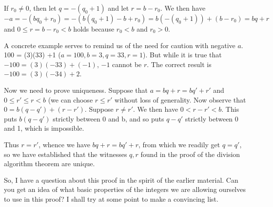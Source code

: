 \documentclass[12pt]{article}
\begin{document}
\begin{description}
If $r_0 \neq 0$, then let $q = -(q_0+1)$ and let $r = b-r_0$.  We then have $-a = -(bq_0+r_0) = -(b(q_0+1)-b+r_0) = b(-(q_0+1)) + (b-r_0) = bq+r$ and $0 \leq r = b-r_0 < b$ holds because $r_0<b$ and $r_0>0$.

A concrete example serves to remind us of the need for caution with negative $a$.  100 = (3)(33) +1 ($a=100, b=3, q = 33, r =1$).  But while it is true that $-100 = (3)(-33) + (-1)$, $-1$ cannot be $r$.  The correct result is $-100 = (3)(-34)+2$.

Now we need to prove uniqueness.  Suppose that $a=bq+r = bq'+r'$ and $0 \leq r' \leq r <b$ (we can choose
$r \leq r'$ without loss of generality.  Now observe that $0 = b(q-q') + (r-r')$.  Suppose $r \neq r'$.  We then have
$0 <r-r'<b$.  This puts $b(q-q')$ strictly between 0 and b, and so puts $q-q'$ strictly between 0 and 1, which is impossible.

Thus $r=r'$, whence we have $bq+r = bq'+r$, from which we readily get $q=q'$, so we have established that the witnesses $q,r$ found in the proof of the division algorithm theorem are unique.

So, I have a question about this proof in the spirit of the earlier material.  Can you get an idea of what basic properties of the integers we are allowing ourselves to use in this proof?  I shall try at some point to make a convincing list.

\end{description}
\end{document}
